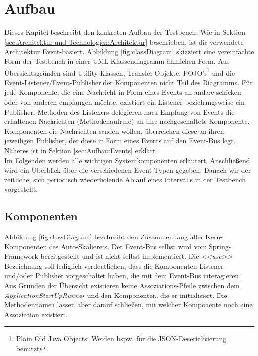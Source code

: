 \chapter{Aufbau}
\label{ch:Aufbau}
Dieses Kapitel beschreibt den konkreten Aufbau der Testbench. Wie in Sektion \ref{sec:Architektur und Technologien:Architektur} beschrieben, ist die verwendete Architektur Event-basiert. Abbildung \ref{fig:classDiagram} skizziert eine vereinfachte Form der Testbench in einer UML-Klassendiagramm ähnlichen Form. Aus Übersichtsgründen sind Utility-Klassen, Transfer-Objekte, POJO's\footnote{Plain Old Java Objects: Werden bspw. für die JSON-Deserialisierung benutzt} und die Event-Listener/Event-Publisher der Komponenten nicht Teil des Diagramms. Für jede Komponente, die eine Nachricht in Form eines Events an andere schicken oder von anderen empfangen möchte, existiert ein Listener beziehungsweise ein Publisher. Methoden des Listeners delegieren nach Empfang von Events die erhaltenen Nachrichten (Methodenaufrufe) an ihre nachgeschaltete Komponente. Komponenten die Nachrichten senden wollen, überreichen diese an ihren jeweiligen Publisher, der diese in Form eines Events auf den Event-Bus legt. Näheres ist in Sektion \ref{sec:Aufbau:Events} erklärt. \\
Im Folgenden werden alle wichtigen Systemkomponenten erläutert. Anschließend wird ein Überblick über die verschiedenen Event-Typen gegeben. Danach wir der zeitliche, sich periodisch wiederholende Ablauf eines Intervalls in der Testbench vorgestellt.









\section{Komponenten}
Abbildung \ref{fig:classDiagram} beschreibt den Zusammenhang aller Kern-Komponenten des Auto-Skalierers. Der Event-Bus selbst wird vom Spring-Framework bereitgestellt und ist nicht selbst implementiert. Die \textit{<<use>>} Bezeichnung soll lediglich verdeutlichen, dass die Komponenten Listener und/oder Publisher vorgeschaltet haben, die mit dem Event-Bus interagieren. Aus Gründen der Übersicht existieren keine Assoziations-Pfeile zwischen dem \textit{ApplicationStartUpRunner} und den Komponenten, die er initialisiert. Die Methodennamen lassen aber darauf schließen, mit welcher Komponente noch eine Assoziation existiert.

